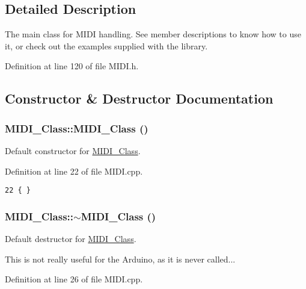 \subsection{Detailed Description}
The main class for MIDI handling. See member descriptions to know how to use it, or check out the examples supplied with the library. 

Definition at line 120 of file MIDI.h.

\subsection{Constructor \& Destructor Documentation}
\hypertarget{class_m_i_d_i___class_5e395e8f748ec53a0818bffd0e2f176f}{
\subsubsection[{MIDI\_\-Class}]{\setlength{\rightskip}{0pt plus 5cm}MIDI\_\-Class::MIDI\_\-Class ()}}
\label{class_m_i_d_i___class_5e395e8f748ec53a0818bffd0e2f176f}


Default constructor for \hyperlink{class_m_i_d_i___class}{MIDI\_\-Class}. 

Definition at line 22 of file MIDI.cpp.

\begin{Code}\begin{verbatim}22 { }
\end{verbatim}
\end{Code}


\hypertarget{class_m_i_d_i___class_cea4c4db7092ba5cb7c147a3fb215e07}{
\subsubsection[{$\sim$MIDI\_\-Class}]{\setlength{\rightskip}{0pt plus 5cm}MIDI\_\-Class::$\sim$MIDI\_\-Class ()}}
\label{class_m_i_d_i___class_cea4c4db7092ba5cb7c147a3fb215e07}


Default destructor for \hyperlink{class_m_i_d_i___class}{MIDI\_\-Class}.\par
 This is not really useful for the Arduino, as it is never called... 

Definition at line 26 of file MIDI.cpp.

